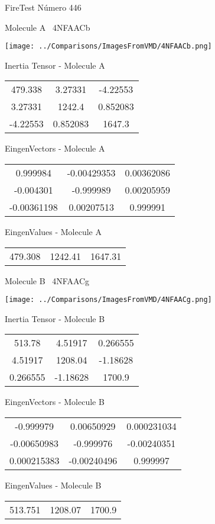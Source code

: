 \vtab[-3cm]
\begin{center}
{\large FireTest \tab Número 446}
\end{center}
\begin{multicols}{2}
\begin{center}

Molecule A \
4NFAACb

\texttt{[image: ../Comparisons/ImagesFromVMD/4NFAACb.png]}

Inertia Tensor - Molecule A \\
\begin{tabular}{|c c c|}
479.338	 & 	3.27331	 & 	-4.22553	 \\
3.27331	 & 	1242.4	 & 	0.852083	 \\
-4.22553	 & 	0.852083	 & 	1647.3
\end{tabular}

\vtab
 EingenVectors - Molecule A     \\
\begin{tabular}{|c c c|}
0.999984	 & 	-0.00429353	 & 	0.00362086	 \\
-0.004301	 & 	-0.999989	 & 	0.00205959	 \\
-0.00361198	 & 	0.00207513	 & 	0.999991
\end{tabular}

\vtab
 EingenValues - Molecule A     \\
\begin{tabular}{|c c c|}
479.308	 & 	1242.41	 & 	1647.31	 \\
\end{tabular}
\columnbreak

Molecule B \
4NFAACg

\texttt{[image: ../Comparisons/ImagesFromVMD/4NFAACg.png]}

Inertia Tensor - Molecule B \\
\begin{tabular}{|c c c|}
513.78	 & 	4.51917	 & 	0.266555	 \\
4.51917	 & 	1208.04	 & 	-1.18628	 \\
0.266555	 & 	-1.18628	 & 	1700.9
\end{tabular}

\vtab
 EingenVectors - Molecule B     \\
\begin{tabular}{|c c c|}
-0.999979	 & 	0.00650929	 & 	0.000231034	 \\
-0.00650983	 & 	-0.999976	 & 	-0.00240351	 \\
0.000215383	 & 	-0.00240496	 & 	0.999997
\end{tabular}

\vtab
 EingenValues - Molecule B     \\
\begin{tabular}{|c c c|}
513.751	 & 	1208.07	 & 	1700.9	 \\
\end{tabular}

\end{center}
\end{multicols}

